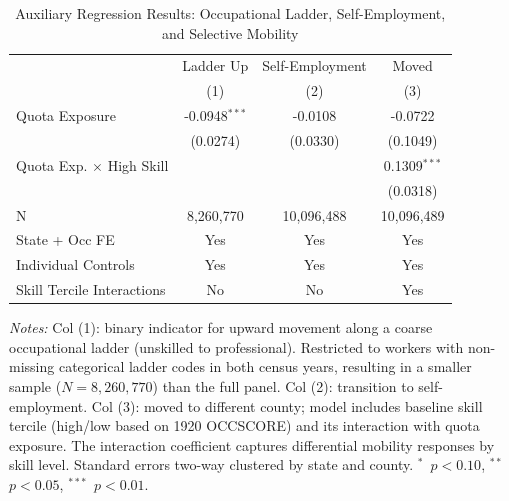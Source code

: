 \begin{table}[htbp]
\centering
\caption{Auxiliary Regression Results: Occupational Ladder, Self-Employment, and Selective Mobility}
\label{tab:auxiliary}
\small
\begin{threeparttable}
\begin{tabular}[t]{lccc}
\toprule
 & Ladder Up & Self-Employment & Moved \\
 & (1) & (2) & (3) \\
\midrule
Quota Exposure & -0.0948$^{***}$ & -0.0108 & -0.0722 \\
 & (0.0274) & (0.0330) & (0.1049) \\
Quota Exp. $\times$ High Skill & & & 0.1309$^{***}$ \\
 & & & (0.0318) \\
\midrule
N & 8,260,770 & 10,096,488 & 10,096,489 \\
State + Occ FE & Yes & Yes & Yes \\
Individual Controls & Yes & Yes & Yes \\
Skill Tercile Interactions & No & No & Yes \\
\bottomrule
\end{tabular}
\begin{tablenotes}[flushleft]\footnotesize
\item \textit{Notes:} Col (1): binary indicator for upward movement along a coarse
occupational ladder (unskilled to professional). Restricted to workers with non-missing
categorical ladder codes in both census years, resulting in a smaller sample ($N = 8{,}260{,}770$)
than the full panel. Col (2): transition to self-employment.
Col (3): moved to different county; model includes baseline skill tercile (high/low based
on 1920 OCCSCORE) and its interaction with quota exposure. The interaction coefficient
captures differential mobility responses by skill level.
Standard errors two-way clustered by state and county.
$^{*}$~$p<0.10$, $^{**}$~$p<0.05$, $^{***}$~$p<0.01$.
\end{tablenotes}
\end{threeparttable}
\end{table}
